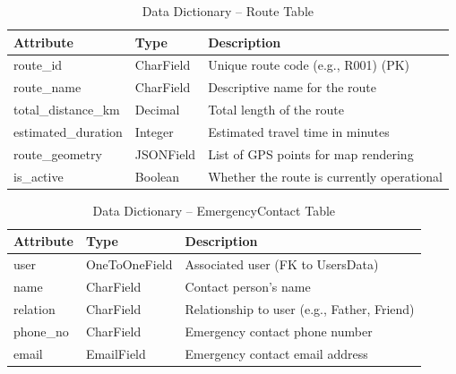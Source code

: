 \begin{table}[H]
\centering
\caption{Data Dictionary – Route Table}
\renewcommand{\arraystretch}{1.5}
\begin{tabular}{|p{3cm}|p{3cm}|p{7cm}|}
\hline
\textbf{Attribute} & \textbf{Type} & \textbf{Description} \\
\hline
route\_id & CharField & Unique route code (e.g., R001) (PK) \\
\hline
route\_name & CharField & Descriptive name for the route \\
\hline
total\_distance\_km & Decimal & Total length of the route \\
\hline
estimated\_duration & Integer & Estimated travel time in minutes \\
\hline
route\_geometry & JSONField & List of GPS points for map rendering \\
\hline
is\_active & Boolean & Whether the route is currently operational \\
\hline
\end{tabular}
\end{table}

\begin{table}[H]
\centering
\caption{Data Dictionary – EmergencyContact Table}
\renewcommand{\arraystretch}{1.5}
\begin{tabular}{|p{3cm}|p{3cm}|p{7cm}|}
\hline
\textbf{Attribute} & \textbf{Type} & \textbf{Description} \\
\hline
user & OneToOneField & Associated user (FK to UsersData) \\
\hline
name & CharField & Contact person's name \\
\hline
relation & CharField & Relationship to user (e.g., Father, Friend) \\
\hline
phone\_no & CharField & Emergency contact phone number \\
\hline
email & EmailField & Emergency contact email address \\
\hline
\end{tabular}
\end{table}

